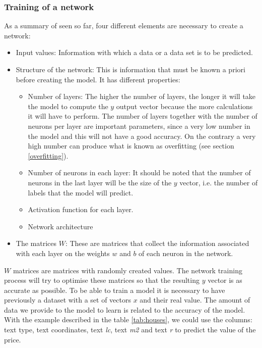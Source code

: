 \subsubsection{Training of a network}\label{training}
As a summary of seen so far, four different elements are necessary to create a network:

\begin{itemize}
\item Input values: Information with which a data or a data set is to be predicted.
\item Structure of the network: This is information that must be known a priori before creating the model. It has different properties:
\begin{itemize}
    \item Number of layers: The higher the number of layers, the longer it will take the model to compute the $y$ output vector because the more calculations it will have to perform. The number of layers together with the number of neurons per layer are important parameters, since a very low number in the model and this will not have a good accuracy. On the contrary a very high number can produce what is known as overfitting (see section \ref{overfitting}).
    
    \item Number of neurons in each layer: It should be noted that the number of neurons in the last layer will be the size of the $y$ vector, i.e. the number of labels that the model will predict.
    \item Activation function for each layer.
    \item Network architecture
\end{itemize}
\item The matrices $W$: These are matrices that collect the information associated with each layer on the weights $w$ and $b$ of each neuron in the network.
\end{itemize}

$W$ matrices are matrices with randomly created values. The network training process will try to optimise these matrices so that the resulting $y$ vector is as accurate as possible. To be able to train a model it is necessary to have previously a dataset with a set of vectors $x$ and their real value. The amount of data we provide to the model to learn is related to the accuracy of the model. With the example described in the table \ref{tab:houses}, we could use the columns: text type, text coordinates, text \textit{lc}, text \textit{m2} and text \textit{r} to predict the value of the price.
\newline


